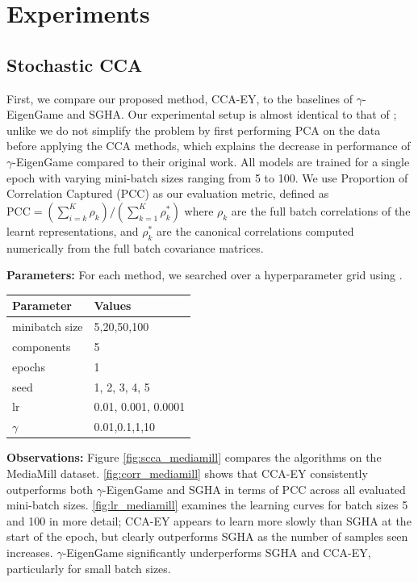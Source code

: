 \section{Experiments}

\subsection{Stochastic CCA}
First, we compare our proposed method, CCA-EY, to the baselines of $\gamma$-EigenGame and SGHA.
Our experimental setup is almost identical to that of \cite{meng2021online, gemp2022generalized}; unlike \cite{gemp2022generalized} we do not simplify the problem by first performing PCA on the data before applying the CCA methods, which explains the decrease in performance of $\gamma$-EigenGame compared to their original work.
All models are trained for a single epoch with varying mini-batch sizes ranging from 5 to 100. We use Proportion of Correlation Captured (PCC) as our evaluation metric, defined as \( \text{PCC} = (\sum_{i=k}^K \rho_k)/ ({\sum_{k=1}^K \rho_k^*}) \) where $\rho_k$ are the full batch correlations of the learnt representations, and $\rho_k^*$ are the canonical correlations computed numerically from the full batch covariance matrices.

\textbf{Parameters:} For each method, we searched over a hyperparameter grid using \citet{wandb}.

\begin{table}[h!]
    \centering
    \begin{tabular}{|l|l|}
        \hline Parameter             & Values              \\
        \hline minibatch size        & 5,20,50,100         \\
        \hline components            & 5                   \\
        \hline epochs                & 1                   \\
        \hline seed                  & 1, 2, 3, 4, 5       \\
        \hline lr                    & 0.01, 0.001, 0.0001 \\
        \hline $\gamma$\footnotemark & 0.01,0.1,1,10       \\
        \hline
    \end{tabular}
\end{table}

\textbf{Observations:}
Figure \ref{fig:scca_mediamill} compares the algorithms on the MediaMill dataset. \cref{fig:corr_mediamill} shows that CCA-EY consistently outperforms both $\gamma$-EigenGame and SGHA in terms of PCC across all evaluated mini-batch sizes.
\cref{fig:lr_mediamill} examines the learning curves for batch sizes 5 and 100 in more detail; CCA-EY appears to learn more slowly than SGHA at the start of the epoch, but clearly outperforms SGHA as the number of samples seen increases. $\gamma$-EigenGame significantly underperforms SGHA and CCA-EY, particularly for small batch sizes.

